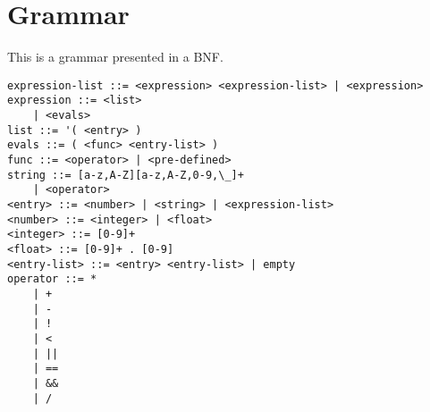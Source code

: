 \section{Grammar}

This is a grammar presented in a BNF. 


\begin{lstlisting}
expression-list ::= <expression> <expression-list> | <expression>
expression ::= <list> 
	| <evals>
list ::= '( <entry> )
evals ::= ( <func> <entry-list> ) 
func ::= <operator> | <pre-defined>
string ::= [a-z,A-Z][a-z,A-Z,0-9,\_]+
	| <operator> 
<entry> ::= <number> | <string> | <expression-list>
<number> ::= <integer> | <float> 
<integer> ::= [0-9]+
<float> ::= [0-9]+ . [0-9]
<entry-list> ::= <entry> <entry-list> | empty
operator ::= *
	| +
	| -
	| !
	| < 
	| ||
	| ==
	| &&
	| /
\end{lstlisting}

